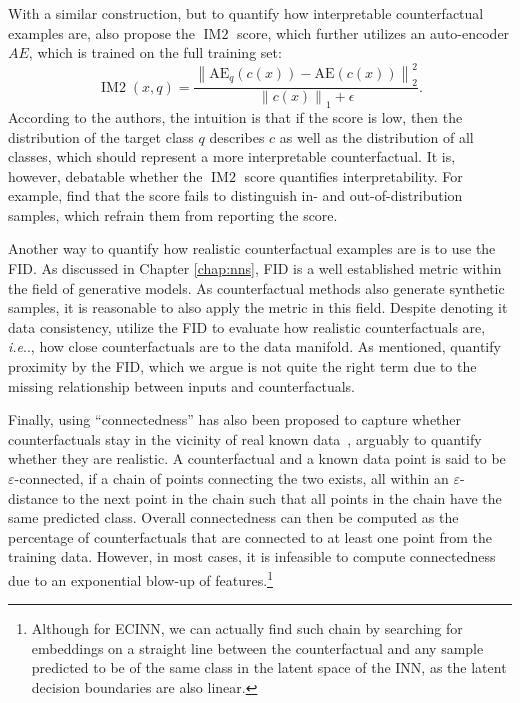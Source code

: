 \documentclass[11pt,a4paper,twoside,openright,final]{memoir}
\makeatletter
\DeclareRobustCommand\onedot{\futurelet\@let@token\@onedot}
\def\@onedot{\ifx\@let@token.\else.\null\fi\xspace}
\def\ie{\emph{i.e}\onedot} \def\Ie{\emph{I.e}\onedot}
\makeatother
\begin{document}
With a similar construction, but to quantify how interpretable counterfactual examples are, \citet{VanLooveren2019} also propose the $\operatorname{IM2}$ score, which further utilizes an auto-encoder $AE$, which is trained on the full training set:
\begin{equation}\label{eq:IM2}
\operatorname{IM2}\left(x, q\right)=\frac{\left\|\mathrm{AE}_{q}\left(c(x)\right)-\mathrm{AE}\left(c(x)\right)\right\|_{2}^{2}}{\left\|c(x)\right\|_{1}+\epsilon}.
\end{equation}
According to the authors, the intuition is that if the score is low, then the distribution of the target class $q$ describes $c$ as well as the distribution of all classes, which should represent a more interpretable counterfactual.
It is, however, debatable whether the $\operatorname{IM2}$ score quantifies interpretability.
For example, \citet{Schut2021} find that the score fails to distinguish in- and out-of-distribution samples, which refrain them from reporting the score.

Another way to quantify how realistic counterfactual examples are is to use the FID.
As discussed in Chapter \ref{chap:nns}, FID is a well established metric within the field of generative models.
As counterfactual methods also generate synthetic samples, it is reasonable to also apply the metric in this field.
Despite denoting it data consistency, \cite{Singla2019} utilize the FID to evaluate how realistic counterfactuals are, \ie, how close counterfactuals are to the data manifold.
As mentioned, \citet{Rodriguez2021} quantify proximity by the FID, which we argue is not quite the right term due to the missing relationship between inputs and counterfactuals.

Finally, using ``connectedness'' has also been proposed to capture whether counterfactuals stay in the vicinity of real known data~\cite{Laugel2019, Pawelczyk2020}, arguably to quantify whether they are realistic. 
A counterfactual and a known data point is said to be $\varepsilon$-connected, if a chain of points connecting the two exists, all within an $\varepsilon$-distance to the next point in the chain such that all points in the chain have the same predicted class.
Overall connectedness can then be computed as the percentage of counterfactuals that are connected to at least one point from the training data.
However, in most cases, it is infeasible to compute connectedness due to an exponential blow-up of features.\footnote{Although for ECINN, we can actually find such chain by searching for embeddings on a straight line between the counterfactual and any sample predicted to be of the same class in the latent space of the INN, as the latent decision boundaries are also linear.}
\end{document}
